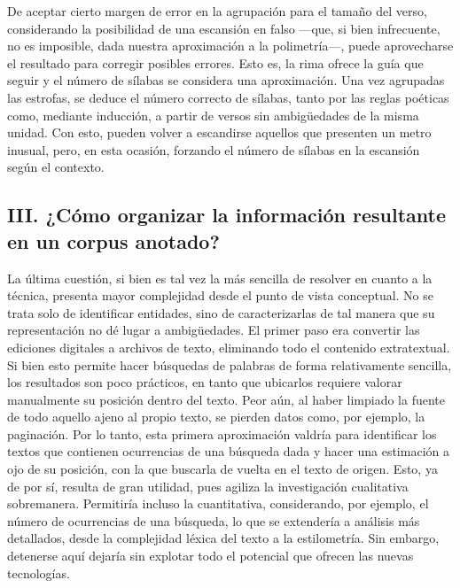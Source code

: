De aceptar cierto margen de error en la agrupación para el tamaño del verso, considerando la posibilidad de una escansión en falso —que, si bien infrecuente, no es imposible, dada nuestra aproximación a la polimetría—, puede aprovecharse el resultado para corregir posibles errores. Esto es, la rima ofrece la guía que seguir y el número de sílabas se considera una aproximación. Una vez agrupadas las estrofas, se deduce el número correcto de sílabas, tanto por las reglas poéticas como, mediante inducción, a partir de versos sin ambigüedades de la misma unidad. Con esto, pueden volver a escandirse aquellos que presenten un metro inusual, pero, en esta ocasión, forzando el número de sílabas en la escansión según el contexto.

\subsection{III. ¿Cómo organizar la información resultante en un corpus anotado?}

La última cuestión, si bien es tal vez la más sencilla de resolver en cuanto a la técnica, presenta mayor complejidad desde el punto de vista conceptual. No se trata solo de identificar entidades, sino de caracterizarlas de tal manera que su representación no dé lugar a ambigüedades. El primer paso era convertir las ediciones digitales a archivos de texto, eliminando todo el contenido extratextual. Si bien esto permite hacer búsquedas de palabras de forma relativamente sencilla, los resultados son poco prácticos, en tanto que ubicarlos requiere valorar manualmente su posición dentro del texto. Peor aún, al haber limpiado la fuente de todo aquello ajeno al propio texto, se pierden datos como, por ejemplo, la paginación. Por lo tanto, esta primera aproximación valdría para identificar los textos que contienen ocurrencias de una búsqueda dada y hacer una estimación a ojo de su posición, con la que buscarla de vuelta en el texto de origen. Esto, ya de por sí, resulta de gran utilidad, pues agiliza la investigación cualitativa sobremanera. Permitiría incluso la cuantitativa, considerando, por ejemplo, el número de ocurrencias de una búsqueda, lo que se extendería a análisis más detallados, desde la complejidad léxica del texto a la estilometría. Sin embargo, detenerse aquí dejaría sin explotar todo el potencial que ofrecen las nuevas tecnologías.

